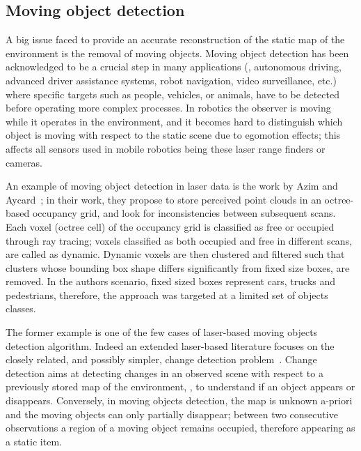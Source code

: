 \subsection{Moving object detection}
A big issue faced to provide an accurate reconstruction of the static map of the environment is the removal of moving objects.
Moving object detection has been acknowledged to be a crucial step in many applications (\eg, autonomous driving, advanced driver assistance systems, robot navigation, video surveillance, etc.) where specific targets such as  people, vehicles, or animals, have to be detected before operating more complex processes.
In robotics the observer is moving while it operates in the environment, and it becomes hard to distinguish which object is moving with respect to the static scene due to egomotion effects; this affects all sensors used in mobile robotics being these laser range finders or cameras.


An example of moving object detection in laser data is the work by Azim and Aycard~\cite{azim2012detection}; in their work, they propose to store perceived point clouds in an octree-based occupancy grid, and look for inconsistencies between subsequent scans. Each voxel (octree cell) of the occupancy grid is classified as free or occupied through ray tracing; voxels classified as both occupied and free in different scans, are called as dynamic. 
Dynamic voxels are then clustered and filtered such that clusters whose bounding box shape differs significantly from fixed size boxes, are removed. In the authors scenario, fixed sized boxes represent cars, trucks and pedestrians, therefore, the approach was targeted at a limited set of objects classes.

The former example is one of the few cases of laser-based moving objects detection algorithm. Indeed an extended laser-based literature focuses on the closely related, and possibly simpler, change detection problem~\cite{vieira2014spatial,andreasson2007has,drews2013fast,xiao2013change}.
Change detection  aims at detecting changes in an observed scene with respect to a previously stored map of the environment, \eg, to understand if an object appears or disappears. 
Conversely, in moving objects detection, the map is unknown a-priori and the moving objects can only partially disappear; between two consecutive observations a region of a moving object remains occupied, therefore appearing as a static item.

